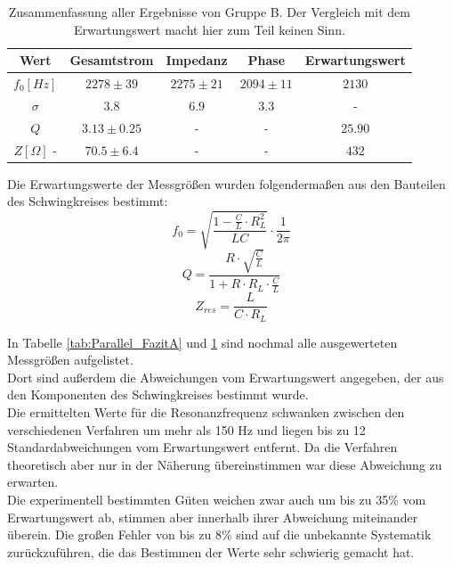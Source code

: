 \documentclass[12pt,a4paper]{article}
\begin{document}
\begin{table}[h]
\centering
\begin{tabular}{|c|c|c|c|c|}
\hline
Wert & Gesamtstrom & Impedanz & Phase & Erwartungswert\\
\hline
\hline
$f_0[Hz]$ & $2278\pm 39$ & $2275\pm 21$ & $2094\pm 11$ & $2130$\\
\hline
$\sigma$ & $3.8$ & $6.9$ & $3.3$ & -\\
\hline
\hline
$Q$ & $3.13\pm 0.25$ &  - & - & $25.90$\\
\hline
\hline
$Z[\Omega]$ - & $70.5\pm 6.4$ & - &  - &$432$\\
\hline
\end{tabular}
\caption{Zusammenfassung aller Ergebnisse von Gruppe B. Der Vergleich mit dem Erwartungswert macht hier zum Teil keinen Sinn.}
\label{tab:Parallel_FazitB}
\end{table}

Die Erwartungswerte der Messgrößen wurden folgendermaßen aus den Bauteilen des Schwingkreises bestimmt:
\begin{equation}
f_0 = \sqrt{\dfrac{1-\frac{C}{L}\cdot R_L^{2}}{LC}}\cdot \dfrac{1}{2\pi}
\end{equation}
\begin{equation}
Q = \dfrac{R\cdot \sqrt{\frac{C}{L}}}{1+R\cdot R_L\cdot \frac{C}{L}}
\end{equation}
\begin{equation}
Z_{res} = \dfrac{L}{C\cdot R_L}
\end{equation}

In Tabelle \ref{tab:Parallel_FazitA} und \ref{tab:Parallel_FazitB} sind nochmal alle ausgewerteten Messgrößen aufgelistet.\\
Dort sind außerdem die Abweichungen vom Erwartungswert angegeben, der aus den Komponenten des Schwingkreises bestimmt wurde.\\
Die ermittelten Werte für die Resonanzfrequenz schwanken zwischen den verschiedenen Verfahren um mehr als 150 Hz und liegen bis zu 12 Standardabweichungen vom Erwartungswert entfernt. Da die Verfahren theoretisch aber nur in der Näherung übereinstimmen war diese Abweichung zu erwarten.\\
Die experimentell bestimmten Güten weichen zwar auch um bis zu 35\% vom Erwartungswert ab, stimmen aber innerhalb ihrer Abweichung miteinander überein. Die großen Fehler von bis zu 8\% sind auf die unbekannte Systematik zurückzuführen, die das Bestimmen der Werte sehr schwierig gemacht hat.
\end{document}
